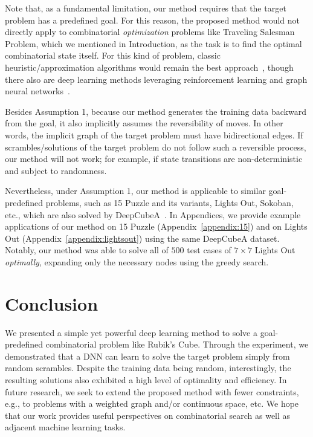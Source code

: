 \documentclass[nohyperref]{article}
\theoremstyle{plain}
\theoremstyle{definition}
\theoremstyle{remark}
\begin{document}
Note that, as a fundamental limitation, our method requires that the target problem has a predefined goal.
For this reason, the proposed method would not directly apply to combinatorial \textit{optimization} problems like Traveling Salesman Problem, which we mentioned in Introduction, as the task is to find the optimal combinatorial state itself.
For this kind of problem, classic heuristic/approximation algorithms would remain the best approach~\citep{rego2011traveling, vanbevern2020118}, though there also are deep learning methods leveraging reinforcement learning and graph neural networks~\citep{mazyavkina2021reinforcement, joshi2022learning}.

Besides Assumption 1, because our method generates the training data backward from the goal, it also implicitly assumes the reversibility of moves.
In other words, the implicit graph of the target problem must have bidirectional edges.
If scrambles/solutions of the target problem do not follow such a reversible process, our method will not work; for example, if state transitions are non-deterministic and subject to randomness.


Nevertheless, under Assumption 1, our method is applicable to similar goal-predefined problems, such as 15 Puzzle and its variants, Lights Out, Sokoban, etc., which are also solved by DeepCubeA~\citep{agostinelli2019solving}.
In Appendices, we provide example applications of our method on 15 Puzzle (Appendix~\ref{appendix:15}) and on Lights Out (Appendix~\ref{appendix:lightsout}) using the same DeepCubeA dataset. Notably, our method was able to solve all of $500$ test cases of $7\times7$ Lights Out \textit{optimally}, expanding only the necessary nodes using the greedy search.


\section{Conclusion}
We presented a simple yet powerful deep learning method to solve a goal-predefined combinatorial problem like Rubik's Cube.
Through the experiment, we demonstrated that a DNN can learn to solve the target problem simply from random scrambles.
Despite the training data being random, interestingly, the resulting solutions also exhibited a high level of optimality and efficiency.
In future research, we seek to extend the proposed method with fewer constraints, e.g., to problems with a weighted graph and/or continuous space, etc.
We hope that our work provides useful perspectives on combinatorial search as well as adjacent machine learning tasks.
\end{document}
